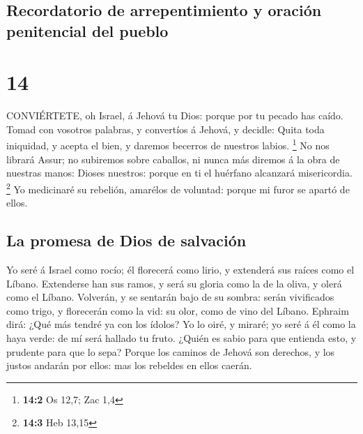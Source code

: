 \hypertarget{recordatorio-de-arrepentimiento-y-oraciuxf3n-penitencial-del-pueblo}{%
\subsection{Recordatorio de arrepentimiento y oración penitencial del
pueblo}\label{recordatorio-de-arrepentimiento-y-oraciuxf3n-penitencial-del-pueblo}}

\hypertarget{section-13}{%
\section{14}\label{section-13}}

 CONVIÉRTETE, oh Israel, á Jehová tu Dios: porque por tu
pecado has caído.  Tomad con vosotros palabras, y convertíos
á Jehová, y decidle: Quita toda iniquidad, y acepta el bien, y daremos
becerros de nuestros labios. \footnote{\textbf{14:2} Os 12,7; Zac 1,4}
 No nos librará Assur; no subiremos sobre caballos, ni nunca
más diremos á la obra de nuestras manos: Dioses nuestros: porque en ti
el huérfano alcanzará misericordia. \footnote{\textbf{14:3} Heb 13,15}
 Yo medicinaré su rebelión, amarélos de voluntad: porque mi
furor se apartó de ellos.

\hypertarget{la-promesa-de-dios-de-salvaciuxf3n}{%
\subsection{La promesa de Dios de
salvación}\label{la-promesa-de-dios-de-salvaciuxf3n}}

 Yo seré á Israel como rocío; él florecerá como lirio, y
extenderá sus raíces como el Líbano.  Extenderse han sus
ramos, y será su gloria como la de la oliva, y olerá como el Líbano.
 Volverán, y se sentarán bajo de su sombra: serán
vivificados como trigo, y florecerán como la vid: su olor, como de vino
del Líbano.  Ephraim dirá: ¿Qué más tendré ya con los
ídolos? Yo lo oiré, y miraré; yo seré á él como la haya verde: de mí
será hallado tu fruto.  ¿Quién es sabio para que entienda
esto, y prudente para que lo sepa? Porque los caminos de Jehová son
derechos, y los justos andarán por ellos: mas los rebeldes en ellos
caerán.
